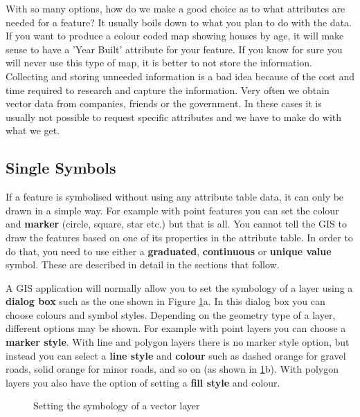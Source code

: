 With so many options, how do we make a good choice as to what attributes are
needed for a feature? It usually boils down to what you plan to do with the
data. If you want to produce a colour coded map showing houses by age, it
will make sense to have a 'Year Built' attribute for your feature. If you
know for sure you will never use this type of map, it is better to not store
the information. Collecting and storing unneeded information is a bad idea
because of the cost and time required to research and capture the
information. Very often we obtain vector data from companies, friends or the
government. In these cases it is usually not possible to request specific
attributes and we have to make do with what we get.

\subsection{Single Symbols}

If a feature is symbolised without using any attribute table data, it can
only be drawn in a simple way. For example with point features you can set
the colour and \textbf{marker} (circle, square, star etc.) but that is all.
You cannot
tell the GIS to draw the features based on one of its properties in the
attribute table. In order to do that, you need to use either a
\textbf{graduated}, \textbf{continuous} or \textbf{unique value} symbol.
These are described in detail in the sections that follow.

A GIS application will normally allow you to set the symbology of a layer
using a \textbf{dialog box} such as the one shown in Figure
\ref{fig:symbols}a. In this
dialog box you can choose colours and symbol styles. Depending on the
geometry type of a layer, different options may be shown. For example with
point layers you can choose a \textbf{marker style}. With line and polygon layers
there is no marker style option, but instead you can select a \textbf{line
style} and \textbf{colour} such as dashed orange for gravel roads, solid
orange for minor roads,
and so on (as shown in \ref{fig:symbols}b). With polygon layers you also
have the option of setting a \textbf{fill style} and colour.

\begin{figure}[ht]
\centering
\caption{Setting the symbology of a vector layer}\label{fig:symbols}
   \goodgap
   \goodgap
\end{figure}

